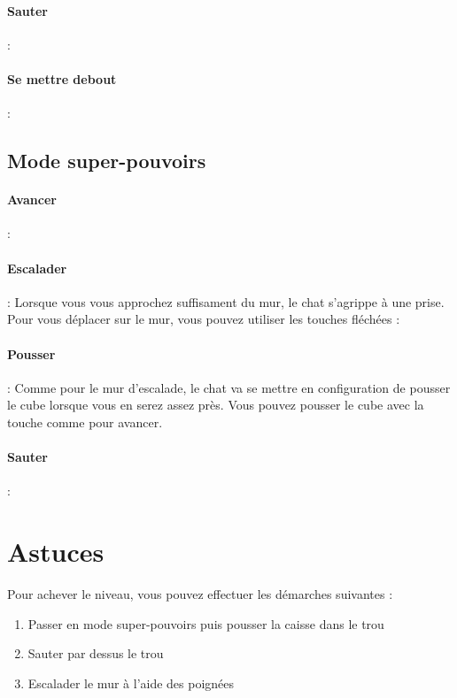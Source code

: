 \documentclass[a4paper,11pt]{article}
\begin{document}
\paragraph{Sauter} : 

\paragraph{Se mettre debout} : 
\subsection{Mode super-pouvoirs}
\paragraph{Avancer} : \fbox{$\rightarrow$}

\paragraph{Escalader} : Lorsque vous vous approchez suffisament du mur, le chat s'agrippe à une prise. Pour vous déplacer sur le mur, vous pouvez utiliser les touches fléchées : \fbox{$\uparrow$} \fbox{$\rightarrow$} \fbox{$\downarrow$} \fbox{$\leftarrow$}

\paragraph{Pousser} : Comme pour le mur d'escalade, le chat va se mettre en configuration de pousser le cube lorsque vous en serez assez près. Vous pouvez pousser le cube avec la touche \fbox{$\rightarrow$} comme pour avancer.

\paragraph{Sauter} : 



\section{Astuces}
Pour achever le niveau, vous pouvez effectuer les démarches suivantes : 
\begin{enumerate}
\item Passer en mode super-pouvoirs puis pousser la caisse dans le trou
\item Sauter par dessus le trou
\item Escalader le mur à l'aide des poignées
\end{enumerate}
\end{document}
